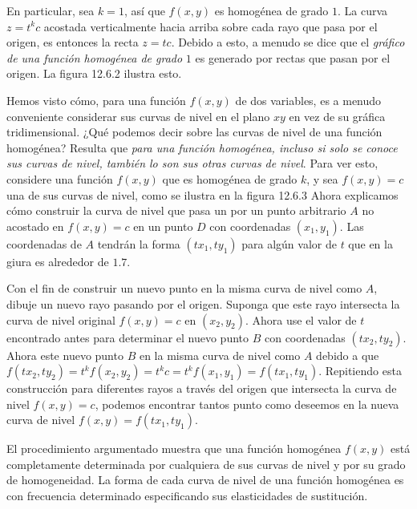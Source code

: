 En particular, sea $k=1$, así que $f\left(x,y\right)$ es homogénea de grado $1$. La curva $z=t^{k}c$ acostada verticalmente hacia arriba sobre cada rayo que pasa por el origen, es entonces la recta $z=tc$. Debido a esto, a menudo se dice que el \emph{gráfico de una función homogénea de grado} $1$ es generado por rectas que pasan por el origen. La figura 12.6.2 ilustra esto.

Hemos visto cómo, para una función $f\left(x,y\right)$ de dos variables, es a menudo conveniente considerar sus curvas de nivel en el plano $xy$ en vez de su gráfica tridimensional. ¿Qué podemos decir sobre las curvas de nivel de una función homogénea? Resulta que \emph{para una función homogénea, incluso si solo se conoce sus curvas de nivel, también lo son sus otras curvas de nivel}. Para ver esto, considere una función $f\left(x,y\right)$ que es homogénea de grado $k$, y sea $f\left(x,y\right)=c$ una de sus curvas de nivel, como se ilustra en la figura 12.6.3 Ahora explicamos cómo construir la curva de nivel que pasa un por un punto arbitrario $A$ no acostado en $f\left(x,y\right)=c$ en un punto $D$ con coordenadas $\left(x_{1},y_{1}\right)$. Las coordenadas de $A$ tendrán la forma $\left(tx_{1},ty_{1}\right)$ para algún valor de $t$ que en la giura es alrededor de $1.7$.

Con el fin de construir un nuevo punto en la misma curva de nivel como $A$, dibuje un nuevo rayo pasando por el origen. Suponga que este rayo intersecta la curva de nivel original $f\left(x,y\right)=c$ en $\left(x_{2},y_{2}\right)$. Ahora use el valor de $t$ encontrado antes para determinar el nuevo punto $B$ con coordenadas $\left(tx_{2},ty_{2}\right)$. Ahora este nuevo punto $B$ en la misma curva de nivel como $A$ debido a que $f\left(tx_{2},ty_{2}\right)=t^{k}f\left(x_{2},y_{2}\right)=t^{k}c=t^{k}f\left(x_{1},y_{1}\right)=f\left(tx_{1},ty_{1}\right)$. Repitiendo esta construcción para diferentes rayos a través del origen que intersecta la curva de nivel $f\left(x,y\right)=c$, podemos encontrar tantos punto como deseemos en la nueva curva de nivel $f\left(x,y\right)=f\left(tx_{1},ty_{1}\right)$.

El procedimiento argumentado muestra que una función homogénea $f\left(x,y\right)$ está completamente determinada por cualquiera de sus curvas de nivel y por su grado de homogeneidad. La forma de cada curva de nivel de una función homogénea es con frecuencia determinado especificando sus elasticidades de sustitución.

